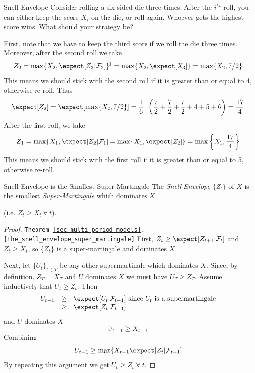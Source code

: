 \documentclass[11pt,a4paper]{article}
\begin{document}
  \begin{example}{Snell Envelope}
    Consider rolling a six-sided die three times. After the $i^{th}$ roll, you can either keep the score $X_i$ on the die, or roll again. Whoever gets the highest score wins. What should your strategy be?
    \par First, note that we have to keep the third score if we roll the die three times. Moreover, after the second roll we take
    \[ Z_2=\max\{X_2,\expect[Z_3|\mathcal{F}_2]\}\footnotemark=\max\{X_2,\expect[X_3]\}=\max\{X_2,7/2\} \]
    This means we should stick with the second roll if it is greater than or equal to 4, otherwise re-roll. Thus
    \[ \expect[Z_2]=\expect[\max\{X_2,7/2\}]=\frac16\cdot\left(\frac72+\frac72+\frac72+4+5+6\right)=\frac{17}4 \]
    After the first roll, we take
    \[ Z_1=\max\{X_1,\expect[Z_2|\mathcal{F}_1]=\max\{X_1,\expect[Z_2]\}=\max\left\{X_1,\frac{17}4\right\} \]
    This means we should stick with the first roll if it is greater than or equal to 5, otherwise re-roll.
  \end{example}

  \begin{theorem}{Snell Envelope is the Smallest Super-Martingale}\label{the_snell_envelope_super_martingale}
    The \textit{Snell Envelope} $\{Z_t\}$ of $X$ is the smallest \textit{Super-Martingale} which dominates $X$.
    \par (i.e. $Z_t\geq X_t\ \forall\ t$).
  \end{theorem}

  \begin{proof}{\texttt{Theorem \ref{sec_multi_period_models}.\ref{the_snell_envelope_super_martingale}}}
    First, $Z_t\geq\expect[Z_{t+1}|\mathcal{F}_t]$ and $Z_t\geq X_t$, so $\{Z_t\}$ is a super-martingale and dominates $X$.
    \par Next, let $\{U_t\}_{t\in T}$ be any other supermartinale which dominates $X$. Since, by definition, $Z_T=X_T$ and $U$ dominates $X$ we must have $U_T\geq Z_T$. Assume inductively that $U_t\geq Z_t$. Then
    \[\begin{array}{rcl}
      U_{t-1}&\geq&\expect[U_t|\mathcal{F}_{t-1}]\text{ since }U_t\text{ is a supermartingale}\\
      &\geq&\expect[Z_t|\mathcal{F}_{t-1}]
    \end{array}\]
    and $U$ dominates $X$
    \[ U_{t-1}\geq X_{t-1} \]
    Combining
    \[ U_{t-1}\geq\max\{X_{t-1}\expect[Z_t|\mathcal{F}_{t-1}] \]
    By repeating this argument we get $U_t\geq Z_t\ \forall\ t$.\proved
  \end{proof}
\end{document}
